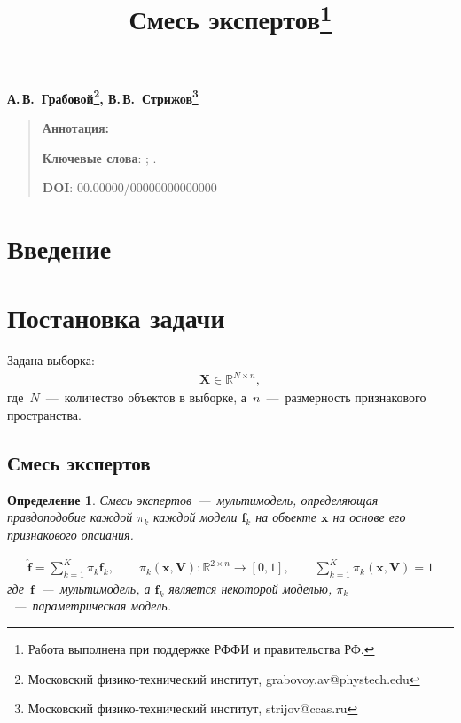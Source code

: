 \documentclass[12pt, twoside]{article}
\newtheorem{definition}{Определение}[section]
\numberwithin{equation}{section}
\begin{document}
\title{\bf Смесь экспертов\thanks{Работа выполнена при поддержке РФФИ и правительства РФ.}}
\date{}
\author{}
\maketitle

\begin{center}
\bf
А.\,В.~Грабовой\footnote{Московский физико-технический институт, grabovoy.av@phystech.edu}, В.\,В.~Стрижов\footnote{Московский физико-технический институт, strijov@ccas.ru}

\end{center}

{\centering\begin{quote}
\textbf{Аннотация:} 


\smallskip
\textbf{Ключевые слова}: ; .

\smallskip
\textbf{DOI}: 00.00000/00000000000000
\end{quote}
}

\section{Введение}

\section{Постановка задачи}

Задана выборка:
\begin{equation}
\label{eq:st:1}
\begin{aligned}
\textbf{X} \in \mathbb{R}^{N \times n},
\end{aligned}
\end{equation}
где~$N$~---~количество объектов в выборке, а~$n$~---~размерность признакового пространства.

\subsection{Смесь экспертов}
\begin{definition}
Смесь экспертов~---~мультимодель, определяющая правдоподобие каждой $\pi_k$ каждой модели $\textbf{f}_k$ на объекте $\textbf{x}$ на основе его признакового опсиания.

\begin{equation}
\label{eq:st:2}
\begin{aligned}
\hat{\textbf{f}} = \sum_{k=1}^{K}\pi_{k}\textbf{f}_k, \qquad \pi_{k}\left(\textbf{x}, \textbf{V}\right):\mathbb{R}^{2\times n} \to [0, 1], \qquad \sum_{k=1}^{K}\pi_{k}\left(\textbf{x}, \textbf{V}\right) = 1
\end{aligned}
\end{equation}
где~$\textbf{f}$~---~мультимодель, а $\textbf{f}_k$ является некоторой моделью, $\pi_k$~---~параметрическая модель.
\end{definition}
\end{document}
